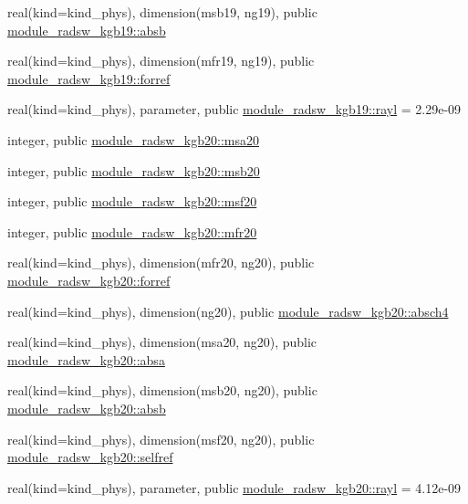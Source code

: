 \begin{DoxyCompactItemize}
\item 
real(kind=kind\+\_\+phys), dimension(msb19, ng19), public \hyperlink{namespacemodule__radsw__kgb19_ad1171c012a1615c4b98eb3e95276867d}{module\+\_\+radsw\+\_\+kgb19\+::absb}
\item 
real(kind=kind\+\_\+phys), dimension(mfr19, ng19), public \hyperlink{namespacemodule__radsw__kgb19_abb4c30ad8e82694b33df78bb2687df6d}{module\+\_\+radsw\+\_\+kgb19\+::forref}
\item 
real(kind=kind\+\_\+phys), parameter, public \hyperlink{namespacemodule__radsw__kgb19_ac79ad61e8d246d6075664df4201373d7}{module\+\_\+radsw\+\_\+kgb19\+::rayl} = 2.\+29e-\/09
\item 
integer, public \hyperlink{namespacemodule__radsw__kgb20_aadf199a3d453192a891b575d9adf8608}{module\+\_\+radsw\+\_\+kgb20\+::msa20}
\item 
integer, public \hyperlink{namespacemodule__radsw__kgb20_a385f5b8c61ed1de7aa3bbb6bd65f522f}{module\+\_\+radsw\+\_\+kgb20\+::msb20}
\item 
integer, public \hyperlink{namespacemodule__radsw__kgb20_a925dc2da02eef4edcf000a14525a7c7e}{module\+\_\+radsw\+\_\+kgb20\+::msf20}
\item 
integer, public \hyperlink{namespacemodule__radsw__kgb20_a9c7964eeb3acb4a11757fce977b73022}{module\+\_\+radsw\+\_\+kgb20\+::mfr20}
\item 
real(kind=kind\+\_\+phys), dimension(mfr20, ng20), public \hyperlink{namespacemodule__radsw__kgb20_a3a660a7564064ca9997af9f95a5293b9}{module\+\_\+radsw\+\_\+kgb20\+::forref}
\item 
real(kind=kind\+\_\+phys), dimension(ng20), public \hyperlink{namespacemodule__radsw__kgb20_a1757aee0ec8211f84e2c9334cc9b0f9d}{module\+\_\+radsw\+\_\+kgb20\+::absch4}
\item 
real(kind=kind\+\_\+phys), dimension(msa20, ng20), public \hyperlink{namespacemodule__radsw__kgb20_a405eabf194b1216dd083c2344e80f5b4}{module\+\_\+radsw\+\_\+kgb20\+::absa}
\item 
real(kind=kind\+\_\+phys), dimension(msb20, ng20), public \hyperlink{namespacemodule__radsw__kgb20_af5b135f82f34831e86a12f726cbe47ad}{module\+\_\+radsw\+\_\+kgb20\+::absb}
\item 
real(kind=kind\+\_\+phys), dimension(msf20, ng20), public \hyperlink{namespacemodule__radsw__kgb20_aa3853af5e29277f9ed2bdd397cab5029}{module\+\_\+radsw\+\_\+kgb20\+::selfref}
\item 
real(kind=kind\+\_\+phys), parameter, public \hyperlink{namespacemodule__radsw__kgb20_a6a00db6ce81c299d44ef5eadc1fe3b5b}{module\+\_\+radsw\+\_\+kgb20\+::rayl} = 4.\+12e-\/09

\end{DoxyCompactItemize}
